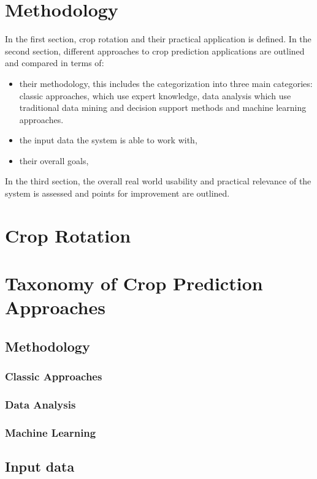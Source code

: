 \documentclass{Academic}
\begin{document}
    \section{Methodology}
    In the first section, crop rotation and their practical application is defined. In the second section, different approaches to crop prediction applications are outlined and compared in terms of:
    \begin{itemize}
        \item their methodology, this includes the categorization into three main categories: classic approaches, which use expert knowledge, data analysis which use traditional data mining and decision support methods and machine learning approaches.
        \item the input data the system is able to work with,
        \item their overall goals,
    \end{itemize}
    In the third section, the overall real world usability and practical relevance of the system is assessed and points for improvement are outlined.

    \section{Crop Rotation}


    \section{Taxonomy of Crop Prediction Approaches}

    \subsection{Methodology}

    \subsubsection{Classic Approaches}

    \subsubsection{Data Analysis}

    \subsubsection{Machine Learning}

    \subsection{Input data}
\end{document}
